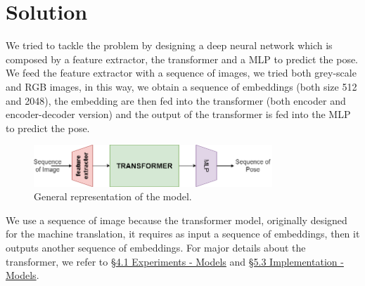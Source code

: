 
\section{Solution}\label{sec:solution}

We tried to tackle the problem by designing a deep neural network which is composed by a feature extractor, the transformer and a MLP to predict the pose.
We feed the feature extractor with a sequence of images, we tried both grey-scale and RGB images, in this way, we obtain a sequence of embeddings (both size 512 and 2048), the embedding are then fed into the transformer (both encoder and encoder-decoder version) and the output of the transformer is fed into the MLP to predict the pose.

\begin{figure}[H]
    \centering
    \includegraphics[width=0.8\textwidth]{images/1_4_general_solution}
    \caption{General representation of the model.}
    \label{fig:figure-1_4_solution}
\end{figure}

We use a sequence of image because the transformer model, originally designed for the machine translation, it requires as input a sequence of embeddings, then it outputs another sequence of embeddings.
For major details about the transformer, we refer to \hyperref[sec:exp-models]{\S4.1 Experiments - Models} and \hyperref[sec:models]{\S5.3 Implementation - Models}.